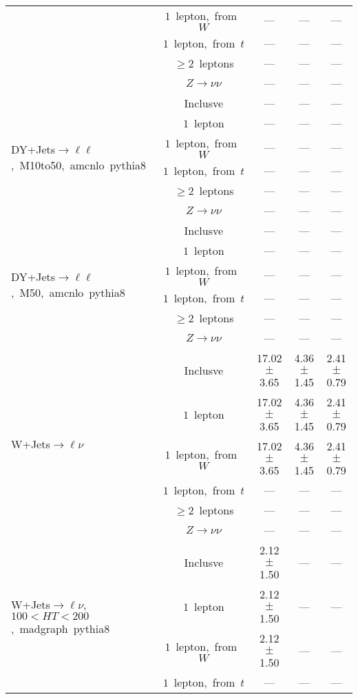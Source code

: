 \documentclass{article}
\begin{document}
\begin{longtable}{|l|c|c|c|c|}
 & $1$~lepton,~from~$W$  & ---  & ---  & --- \\* 
 & $1$~lepton,~from~$t$  & ---  & ---  & --- \\* 
 & $\ge2$~leptons  & ---  & ---  & --- \\* 
 & $Z\rightarrow\nu\nu$  & ---  & ---  & --- \\* 
\hline 
\multirow{6}{*}{DY+Jets$\rightarrow\ell\ell$,~M10to50,~amcnlo~pythia8} & Inclusve  & ---  & ---  & --- \\* 
 & $1$~lepton  & ---  & ---  & --- \\* 
 & $1$~lepton,~from~$W$  & ---  & ---  & --- \\* 
 & $1$~lepton,~from~$t$  & ---  & ---  & --- \\* 
 & $\ge2$~leptons  & ---  & ---  & --- \\* 
 & $Z\rightarrow\nu\nu$  & ---  & ---  & --- \\* 
\hline 
\multirow{6}{*}{DY+Jets$\rightarrow\ell\ell$,~M50,~amcnlo~pythia8} & Inclusve  & ---  & ---  & --- \\* 
 & $1$~lepton  & ---  & ---  & --- \\* 
 & $1$~lepton,~from~$W$  & ---  & ---  & --- \\* 
 & $1$~lepton,~from~$t$  & ---  & ---  & --- \\* 
 & $\ge2$~leptons  & ---  & ---  & --- \\* 
 & $Z\rightarrow\nu\nu$  & ---  & ---  & --- \\* 
\hline 
\multirow{6}{*}{W+Jets$\rightarrow\ell\nu$} & Inclusve  & 17.02 $\pm$ 3.65  & 4.36 $\pm$ 1.45  & 2.41 $\pm$ 0.79 \\* 
 & $1$~lepton  & 17.02 $\pm$ 3.65  & 4.36 $\pm$ 1.45  & 2.41 $\pm$ 0.79 \\* 
 & $1$~lepton,~from~$W$  & 17.02 $\pm$ 3.65  & 4.36 $\pm$ 1.45  & 2.41 $\pm$ 0.79 \\* 
 & $1$~lepton,~from~$t$  & ---  & ---  & --- \\* 
 & $\ge2$~leptons  & ---  & ---  & --- \\* 
 & $Z\rightarrow\nu\nu$  & ---  & ---  & --- \\* 
\hline 
\multirow{6}{*}{W+Jets$\rightarrow\ell\nu$,~$100<HT<200$,~madgraph~pythia8} & Inclusve  & 2.12 $\pm$ 1.50  & ---  & --- \\* 
 & $1$~lepton  & 2.12 $\pm$ 1.50  & ---  & --- \\* 
 & $1$~lepton,~from~$W$  & 2.12 $\pm$ 1.50  & ---  & --- \\* 
 & $1$~lepton,~from~$t$  & ---  & ---  & --- \\* 

\end{longtable}
\end{document}
